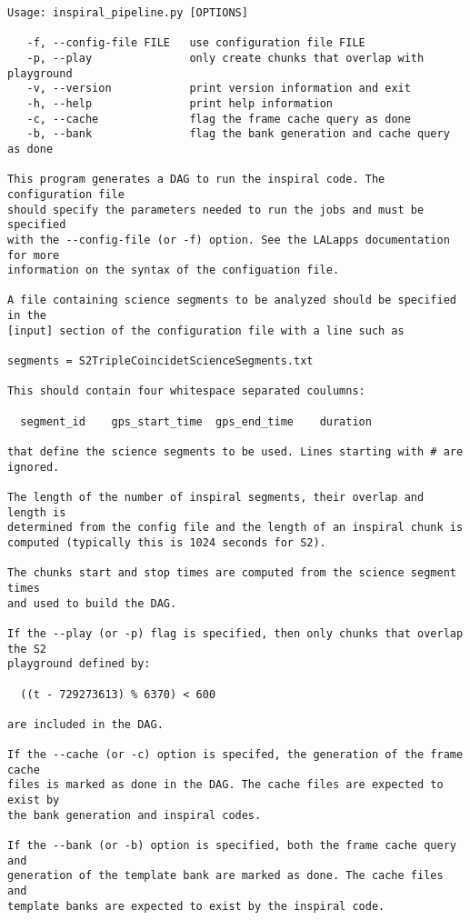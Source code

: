 \begin{verbatim}
Usage: inspiral_pipeline.py [OPTIONS]

   -f, --config-file FILE   use configuration file FILE
   -p, --play               only create chunks that overlap with playground
   -v, --version            print version information and exit
   -h, --help               print help information
   -c, --cache              flag the frame cache query as done
   -b, --bank               flag the bank generation and cache query as done

This program generates a DAG to run the inspiral code. The configuration file 
should specify the parameters needed to run the jobs and must be specified 
with the --config-file (or -f) option. See the LALapps documentation for more
information on the syntax of the configuation file.

A file containing science segments to be analyzed should be specified in the 
[input] section of the configuration file with a line such as

segments = S2TripleCoincidetScienceSegments.txt

This should contain four whitespace separated coulumns:

  segment_id    gps_start_time  gps_end_time    duration

that define the science segments to be used. Lines starting with # are ignored.

The length of the number of inspiral segments, their overlap and length is 
determined from the config file and the length of an inspiral chunk is
computed (typically this is 1024 seconds for S2).

The chunks start and stop times are computed from the science segment times
and used to build the DAG.

If the --play (or -p) flag is specified, then only chunks that overlap the S2
playground defined by:

  ((t - 729273613) % 6370) < 600

are included in the DAG.

If the --cache (or -c) option is specifed, the generation of the frame cache 
files is marked as done in the DAG. The cache files are expected to exist by
the bank generation and inspiral codes.

If the --bank (or -b) option is specified, both the frame cache query and
generation of the template bank are marked as done. The cache files and
template banks are expected to exist by the inspiral code.
\end{verbatim}


